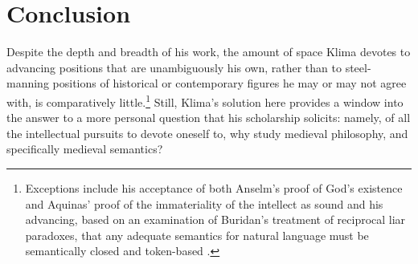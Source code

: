 \documentclass[]{article}
\begin{document}

\section{Conclusion}
Despite the depth and breadth of his work, 
the amount of space Klima devotes to advancing positions that are unambiguously his own, 
rather than to steel-manning positions of historical or contemporary figures 
he may or may not agree with,
is comparatively little.\footnote{Exceptions include his acceptance of both Anselm's proof of God's existence and Aquinas' proof of the immateriality of the intellect as sound \autocite{Klima2000,Klima2009a} 
and his advancing, 
based on an examination of Buridan's treatment of reciprocal liar paradoxes, 
that any adequate semantics for natural language must be semantically closed and token-based \autocite{Klima2004,Klima2008}.} 
Still, 
Klima's solution here provides a window into the answer to a more personal question that his scholarship solicits: 
namely, 
of all the intellectual pursuits to devote oneself to, 
why study medieval philosophy, 
and specifically medieval semantics?
\end{document}
